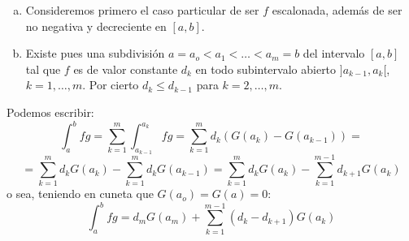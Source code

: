 \begin{enumerate}[a)]
\item Consideremos primero el caso particular de ser $f$ escalonada, además de ser no negativa y decreciente en $[a,b]$.
\item Existe pues una subdivisión $a=a_o < a_1 < \ldots < a_m=b$ del intervalo $[a,b]$ tal que $f$ es de valor constante $d_k$ en todo subintervalo abierto $]a_{k-1},a_k[$, $k=1,\ldots , m$. Por cierto $d_k \leq d_{k-1}$ para $k=2, \ldots,m$. \\
\end{enumerate}
Podemos escribir:\\
$$
\int_a^b fg=\sum_{k=1}^m \int_{a_{k-1}}^{a_k}fg= \sum_{k=1}^m d_k (G(a_k)-G(a_{k-1}))=
$$
$$
=\sum_{k=1}^m d_k G(a_k)-\sum_{k=1}^m d_k G(a_{k-1})=\sum_{k=1}^m d_k G(a_k)- \sum_{k=1}^{m-1}d_{k+1}G(a_k)
$$
o sea, teniendo en cuneta que $G(a_o)=G(a)=0:$
\begin{equation}
\int_a^b fg=d_mG(a_m) + \sum_{k=1}^{m-1}(d_k -d_{k+1})G(a_k)
\end{equation}

